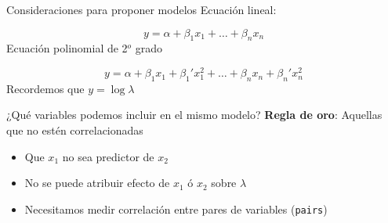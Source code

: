 \documentclass[
  11pt,
  ignorenonframetext,
]{beamer}
\providecommand{\tightlist}{%
  \setlength{\itemsep}{0pt}\setlength{\parskip}{0pt}}
\begin{document}
\begin{frame}{Consideraciones para proponer modelos}
\protect\hypertarget{consideraciones-para-proponer-modelos-1}{}
Ecuación lineal:

\[ y = \alpha + \beta_1 x_1 + \dots + \beta_n x_n\] Ecuación polinomial
de 2\(^o\) grado

\[ y = \alpha + \beta_1 x_1 + \beta_1' x_1^2 + \dots + \beta_n x_n + \beta_n' x_n^2\]
Recordemos que \(y = \log \lambda\)
\end{frame}

\begin{frame}[fragile]{¿Qué variables podemos incluir en el mismo
modelo?}
\protect\hypertarget{quuxe9-variables-podemos-incluir-en-el-mismo-modelo}{}
\textbf{Regla de oro}: Aquellas que no estén correlacionadas

\begin{itemize}
\tightlist
\item
  Que \(x_1\) no sea predictor de \(x_2\)
\item
  No se puede atribuir efecto de \(x_1\) ó \(x_2\) sobre \(\lambda\)
\item
  Necesitamos medir correlación entre pares de variables
  (\texttt{pairs})
\end{itemize}
\end{frame}
\end{document}
